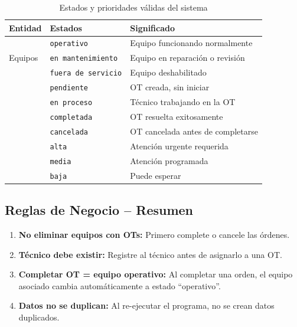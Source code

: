 \documentclass[12pt, a4paper]{article}
\begin{document}
\begin{table}[H]
    \centering
    \begin{tabularx}{\textwidth}{l l X}
        \toprule
        \textbf{Entidad} & \textbf{Estados} & \textbf{Significado} \\
        \midrule
        \multirow{3}{*}{Equipos} & \texttt{operativo} & Equipo funcionando normalmente \\
        & \texttt{en mantenimiento} & Equipo en reparaci\'on o revisi\'on \\
        & \texttt{fuera de servicio} & Equipo deshabilitado \\
        \addlinespace
        \multirow{4}{*}{\'Ordenes} & \texttt{pendiente} & OT creada, sin iniciar \\
        & \texttt{en proceso} & T\'ecnico trabajando en la OT \\
        & \texttt{completada} & OT resuelta exitosamente \\
        & \texttt{cancelada} & OT cancelada antes de completarse \\
        \addlinespace
        \multirow{3}{*}{Prioridades} & \texttt{alta} & Atenci\'on urgente requerida \\
        & \texttt{media} & Atenci\'on programada \\
        & \texttt{baja} & Puede esperar \\
        \bottomrule
    \end{tabularx}
    \caption{Estados y prioridades v\'alidas del sistema}
\end{table}

\subsection{Reglas de Negocio -- Resumen}

\begin{tipbox}
\begin{enumerate}
    \item \textbf{No eliminar equipos con OTs:} Primero complete o cancele las \'ordenes.
    \item \textbf{T\'ecnico debe existir:} Registre al t\'ecnico antes de asignarlo a una OT.
    \item \textbf{Completar OT = equipo operativo:} Al completar una orden, el equipo asociado cambia autom\'aticamente a estado ``operativo''.
    \item \textbf{Datos no se duplican:} Al re-ejecutar el programa, no se crean datos duplicados.
\end{enumerate}
\end{tipbox}
\end{document}
